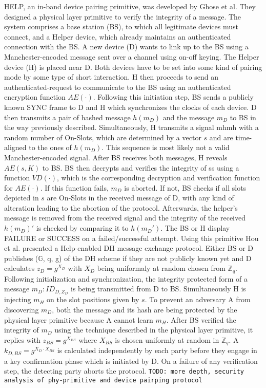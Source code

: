 \documentclass[conference]{IEEEtran}
\begin{document}
HELP, an in-band device pairing primitive, was developed by Ghose et al. They designed a physical layer primitive to verify the integrity of a message. The system comprises a base station (BS), to which all legitimate devices must connect, and a Helper device, which already maintains an authenticated connection with the BS. A new device (D) wants to link up to the BS using a Manchester-encoded message sent over a channel using on-off keying.
The Helper device (H) is placed near D. Both devices have to be set into some kind of pairing mode by some type of short interaction. H then proceeds to send an authenticated-request to communicate to the BS using an authenticated encryption function $AE(\cdot)$. Following this initiation step, BS sends a publicly known SYNC frame to D and H which synchronizes the clocks of each device.
D then transmits a pair of hashed message $h(m_D)$ and the message $m_D$ to BS in the way previously described. Simultaneously, H transmits a signal mhmh with a random number of On-Slots, which are determined by a vector $s$ and are time-aligned to the ones of $h(m_D)$. This sequence is most likely not a valid Manchester-encoded signal.
After BS receives both messages, H reveals $AE(s,K)$ to BS. BS then decrypts and verifies the integrity of ss using a function $VD(\cdot)$, which is the corresponding decryption and verification function for $AE(\cdot)$. If this function fails, $m_D$ is aborted. If not, BS checks if all slots depicted in $s$ are On-Slots in the received message of D, with any kind of alteration leading to the abortion of the protocol.
Afterwards, the helper's message is removed from the received signal and the integrity of the received $h(m_D)'$ is checked by comparing it to $h(m_D')$. The BS or H display FAILURE or SUCCESS on a failed/successful attempt.
Using this primitive Hou et al. presented a Help-enabled DH message exchange protocol. Either BS or D publishes ($\mathbb{G}$, q, g) of the DH scheme if they are not publicly known yet and D calculates $z_D = g^{X_D}$ with $X_D$ being uniformaly at random chosen from $\mathbb{Z}_q$. Following initialization and synchronization, the integrity protected form of a message $m_D: ID_{D,Z_D}$ is being transmitted from D to BS. Simultaneously H is injecting $m_H$ on the slot positions given by $s$. To prevent an adversary A from discovering $m_D$, both the message and its hash are being protected by the physical layer primitive because A cannot learn $m_H$. After BS verified the integrity of $m_D$ using the technique described in the physical layer primitive, it replies with $z_{BS} = g^{X_{BS}}$ where $X_{BS}$ is chosen uniformly at random in $\mathbb{Z}_q$. A $k_{D,BS}=g^{X_D \cdot X_{BS}}$ is calculated independently by each party before they engage in a key confirmation phase which is initiated by D. On a failure of any verification step, the detecting party aborts the protocol. 
 \texttt{TODO: more depth, security analysis of phy-primitive and device pairping protocol}\\
\end{document}
